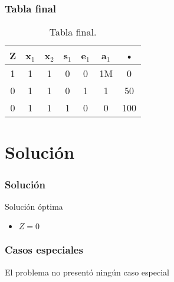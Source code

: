 \documentclass{beamer}
\begin{document}
\begin{frame}  
\frametitle{Tabla final} 
\begin{table}[H] 
\begin{center} 
\begin{tabular}{|*{7}{c|}} 
\hline 
\textbf{Z}  & \textbf{x$_{1}$} & \textbf{x$_{2}$} & \textbf{s$_{1}$} & \textbf{e$_{1}$} & \textbf{a$_{1}$} & \textbf{•} \\\hline \hline 
1 & 1 & 1 & 0 & 0 & 1M & 0 \\\hline 
0 & 1 & 1 & 0 & 1 & 1 & 50\\ 
\hline 
0 & 1 & 1 & 1 & 0 & 0 & 100\\ 
\hline 
\end{tabular} 
\caption{Tabla final.} 
\end{center} 
\end{table} 
\end{frame} 
 

\section{Solución} 
\begin{frame} 
\frametitle{Solución} 
\begin{exampleblock}{Solución óptima} 
\begin{itemize} 
\item $Z = 0$ 
\end{itemize} 
\end{exampleblock} 
\end{frame} 


\begin{frame} 
\frametitle{Casos especiales} 
El problema no presentó ningún caso especial 
\end{frame} 
\end{document}
